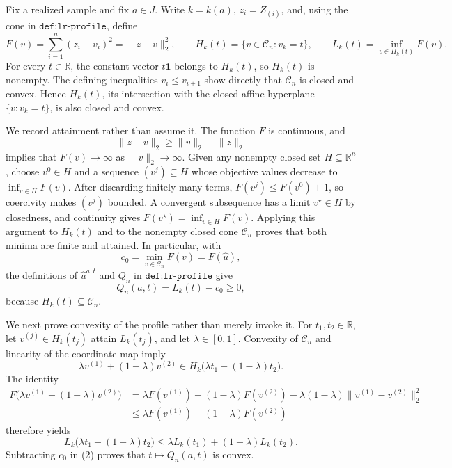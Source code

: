 Fix a realized sample and fix \(a\in J\).  Write \(k=k(a)\), \(z_i=Z_{(i)}\), and, using the cone in \(\texttt{def:lr-profile}\), define
\[
 F(v)=\sum_{i=1}^{n}(z_i-v_i)^2=\lVert z-v\rVert_2^2,
 \qquad
 H_k(t)=\{v\in\mathcal C_n:v_k=t\},
 \qquad
 L_k(t)=\inf_{v\in H_k(t)}F(v).
\]
For every \(t\in\mathbb R\), the constant vector \(t\mathbf 1\) belongs to \(H_k(t)\), so \(H_k(t)\) is nonempty.  The defining inequalities \(v_i\le v_{i+1}\) show directly that \(\mathcal C_n\) is closed and convex.  Hence \(H_k(t)\), its intersection with the closed affine hyperplane \(\{v:v_k=t\}\), is also closed and convex.

We record attainment rather than assume it.  The function \(F\) is continuous, and
\[
 \lVert z-v\rVert_2\ge \lVert v\rVert_2-\lVert z\rVert_2
\]
implies that \(F(v)\to\infty\) as \(\lVert v\rVert_2\to\infty\).  Given any nonempty closed set \(H\subseteq\mathbb R^n\), choose \(v^0\in H\) and a sequence \((v^j)\subseteq H\) whose objective values decrease to \(\inf_{v\in H}F(v)\).  After discarding finitely many terms, \(F(v^j)\le F(v^0)+1\), so coercivity makes \((v^j)\) bounded.  A convergent subsequence has a limit \(v^\star\in H\) by closedness, and continuity gives \(F(v^\star)=\inf_{v\in H}F(v)\).  Applying this argument to \(H_k(t)\) and to the nonempty closed cone \(\mathcal C_n\) proves that both minima are finite and attained.  In particular, with
\[
 c_0=\min_{v\in\mathcal C_n}F(v)=F(\widehat u),
\]
the definitions of \(\widehat u^{a,t}\) and \(Q_n\) in \(\texttt{def:lr-profile}\) give
\[
 Q_n(a,t)=L_k(t)-c_0\ge0,                                      \tag{1}
\]
because \(H_k(t)\subseteq\mathcal C_n\).

We next prove convexity of the profile rather than merely invoke it.  For \(t_1,t_2\in\mathbb R\), let \(v^{(j)}\in H_k(t_j)\) attain \(L_k(t_j)\), and let \(\lambda\in[0,1]\).  Convexity of \(\mathcal C_n\) and linearity of the coordinate map imply
\[
 \lambda v^{(1)}+(1-\lambda)v^{(2)}
 \in H_k\bigl(\lambda t_1+(1-\lambda)t_2\bigr).
\]
The identity
\[
 \begin{aligned}
 F\bigl(\lambda v^{(1)}+(1-\lambda)v^{(2)}\bigr)
 &=\lambda F(v^{(1)})+(1-\lambda)F(v^{(2)})
   -\lambda(1-\lambda)\lVert v^{(1)}-v^{(2)}\rVert_2^2\\
 &\le \lambda F(v^{(1)})+(1-\lambda)F(v^{(2)})
\end{aligned}
\]
therefore yields
\[
 L_k\bigl(\lambda t_1+(1-\lambda)t_2\bigr)
 \le \lambda L_k(t_1)+(1-\lambda)L_k(t_2).                    \tag{2}
\]
Subtracting \(c_0\) in (2) proves that \(t\mapsto Q_n(a,t)\) is convex.

